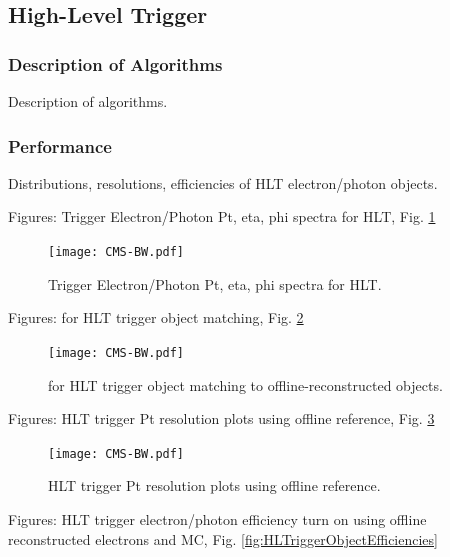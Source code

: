 \subsection{High-Level Trigger}
\subsubsection{Description of Algorithms}
Description of algorithms.
\subsubsection{Performance}
Distributions, resolutions, efficiencies of HLT electron/photon objects.

Figures: Trigger Electron/Photon Pt, eta, phi spectra for HLT, Fig. \ref{fig:HLTriggerObjectSpectra}

 \begin{figure}[htb]
  \begin{center}
    \texttt{[image: CMS-BW.pdf]}
  \end{center}
  \caption[Trigger Electron/Photon Pt, eta, phi spectra for HLT]{Trigger Electron/Photon Pt, eta, phi spectra for HLT.}
  \label{fig:HLTriggerObjectSpectra}
 \end{figure}


Figures: \DR for HLT trigger object matching, Fig. \ref{fig:HLTriggerObjectDeltaR}

 \begin{figure}[htb]
  \begin{center}
    \texttt{[image: CMS-BW.pdf]}
  \end{center}
  \caption[\DR for HLT trigger object matching to offline]{\DR for HLT trigger object matching to offline-reconstructed objects.}
  \label{fig:HLTriggerObjectDeltaR}
 \end{figure}

Figures: HLT trigger Pt resolution plots using offline reference, Fig. \ref{fig:HLTriggerObjectResolutions}

 \begin{figure}[htb]
  \begin{center}
    \texttt{[image: CMS-BW.pdf]}
  \end{center}
  \caption[HLT trigger Pt resolution plots using offline reference]{HLT trigger Pt resolution plots using offline reference.}
  \label{fig:HLTriggerObjectResolutions}
 \end{figure}

Figures: HLT trigger electron/photon efficiency turn on using offline reconstructed electrons and MC, Fig. \ref{fig:HLTriggerObjectEfficiencies}


